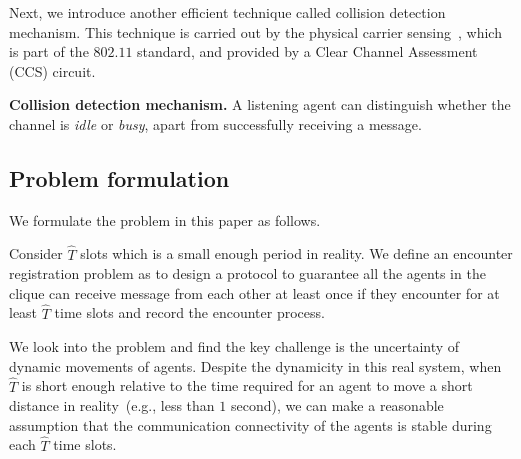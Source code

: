 



 

Next, we introduce another efficient technique called collision detection mechanism.
This technique is carried out by the physical carrier sensing~\cite{Yang2005On}, which is part of 
the $802.11$ standard, and provided by a Clear Channel Assessment (CCS) circuit.

\textbf{Collision detection mechanism.}
A listening agent can distinguish whether the channel is \emph{idle} or \emph{busy}, 
apart from successfully receiving a message. 

\subsection{Problem formulation}

We formulate the problem in this paper as follows.
\begin{problem}
    Consider $\hat{T}$ slots which is a small enough period in reality.
    We define an encounter registration problem as to design a protocol to guarantee 
    all the agents in the clique can receive message from each other at least once 
    if they encounter for at least $\hat{T}$ time slots and record the encounter process. 
\end{problem}


We look into the problem and find the key challenge is 
the uncertainty of dynamic movements
of agents. Despite the dynamicity in this real system, 
when $\hat{T}$ is short enough relative to 
the time required for an agent to move a short distance
in reality~(e.g., less than $1$ second),
we can make a reasonable assumption that the communication 
connectivity of the agents is stable during each $\hat{T}$ time slots. 

